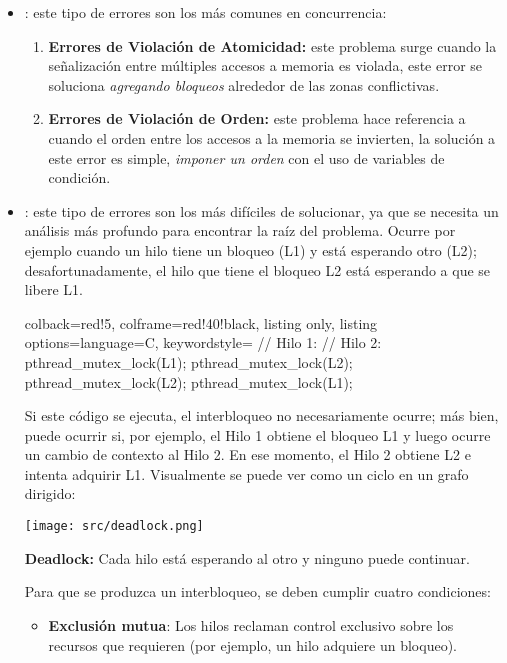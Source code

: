 \documentclass[openany]{book}
\begin{document}
\begin{itemize}
    \item {}: este tipo de errores son los más comunes en concurrencia:
    \begin{enumerate}
        \item \textbf{Errores de Violación de Atomicidad:} este problema surge cuando la señalización entre múltiples accesos a memoria es violada, este error se soluciona \textit{agregando bloqueos} alrededor de las zonas conflictivas.
        \item \textbf{Errores de Violación de Orden:} este problema hace referencia a cuando el orden entre los accesos a la memoria se invierten, la solución a este error es simple, \textit{imponer un orden} con el uso de variables de condición.
    \end{enumerate}
    \item {}: este tipo de errores son los más difíciles de solucionar, ya que se necesita un análisis más profundo para encontrar la raíz del problema. Ocurre por ejemplo cuando un hilo tiene un bloqueo (L1) y está esperando otro (L2); desafortunadamente, el hilo que tiene el bloqueo L2 está esperando a que se libere L1.
    \begin{tcblisting}{colback=red!5, colframe=red!40!black, listing only, listing options={language=C, keywordstyle=\color{blue!35!white}\bfseries}}
    // Hilo 1:                // Hilo 2:
    pthread_mutex_lock(L1);   pthread_mutex_lock(L2);
    pthread_mutex_lock(L2);   pthread_mutex_lock(L1);
    \end{tcblisting}        
    Si este código se ejecuta, el interbloqueo no necesariamente ocurre; más bien, puede ocurrir si, por ejemplo, el Hilo 1 obtiene el bloqueo L1 y luego ocurre un cambio de contexto al Hilo 2. En ese momento, el Hilo 2 obtiene L2 e intenta adquirir L1. Visualmente se puede ver como un ciclo en un grafo dirigido:
    \begin{center}
        \texttt{[image: src/deadlock.png]}
        \begin{tcolorbox}[colback=red!5, colframe=red!40!black]
            \textbf{Deadlock:} Cada hilo está esperando al otro y ninguno puede continuar.
        \end{tcolorbox}
    \end{center}
    Para que se produzca un interbloqueo, se deben cumplir cuatro condiciones:
    \begin{itemize}
        \item \textbf{Exclusión mutua}: Los hilos reclaman control exclusivo sobre los recursos que requieren (por ejemplo, un hilo adquiere un bloqueo).

\end{itemize}
\end{itemize}
\end{document}
